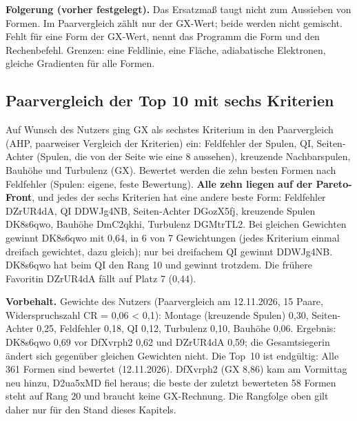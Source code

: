 \textbf{Folgerung (vorher festgelegt).} Das Ersatzmaß taugt nicht zum Aussieben von Formen. Im Paarvergleich zählt nur der GX-Wert; beide werden nicht gemischt. Fehlt für eine Form der GX-Wert, nennt das Programm die Form und den Rechenbefehl.
Grenzen: eine Feldlinie, eine Fläche, adiabatische Elektronen, gleiche Gradienten für alle Formen.

\subsection{Paarvergleich der Top 10 mit sechs Kriterien}
Auf Wunsch des Nutzers ging GX als sechstes Kriterium in den Paarvergleich (AHP, paarweiser Vergleich der Kriterien) ein: Feldfehler der Spulen, QI, Seiten-Achter (Spulen, die von der Seite wie eine 8 aussehen), kreuzende Nachbarspulen, Bauhöhe und Turbulenz (GX).
Bewertet werden die zehn besten Formen nach Feldfehler (Spulen: eigene, feste Bewertung). \textbf{Alle zehn liegen auf der Pareto-Front}, und jedes der sechs Kriterien hat eine andere beste Form: Feldfehler DZrUR4dA, QI DDWJg4NB, Seiten-Achter DGozX5fj, kreuzende Spulen DK8s6qwo,
Bauhöhe DmC2qkhi, Turbulenz DGMtrTL2. Bei gleichen Gewichten gewinnt DK8s6qwo mit 0,64, in 6 von 7 Gewichtungen (jedes Kriterium einmal dreifach gewichtet, dazu gleich); nur bei dreifachem QI gewinnt DDWJg4NB. DK8s6qwo hat beim QI den Rang 10 und gewinnt trotzdem.
Die frühere Favoritin DZrUR4dA fällt auf Platz 7 (0,44).

\textbf{Vorbehalt.} Gewichte des Nutzers (Paarvergleich am 12.11.2026, 15 Paare, Widerspruchszahl CR = 0,06 < 0,1): Montage (kreuzende Spulen) 0,30, Seiten-Achter 0,25, Feldfehler 0,18, QI 0,12, Turbulenz 0,10, Bauhöhe 0,06. Ergebnis: DK8s6qwo 0,69 vor DfXvrph2 0,62 und DZrUR4dA 0,59; die Gesamtsiegerin ändert sich gegenüber gleichen Gewichten nicht. Die Top~10 ist endgültig: Alle 361 Formen sind bewertet (12.11.2026). DfXvrph2 (GX 8,86) kam am Vormittag neu hinzu, D2ua5xMD fiel heraus; die beste der zuletzt bewerteten 58 Formen steht auf Rang 20 und braucht keine GX-Rechnung.
Die Rangfolge oben gilt daher nur für den Stand dieses Kapitels.
